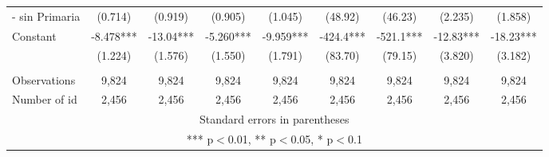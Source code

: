 {\begin{tabular}{lcccccccc}
-    sin Primaria & (0.714) & (0.919) & (0.905) & (1.045) & (48.92) & (46.23) & (2.235) & (1.858) \\
Constant & -8.478*** & -13.04*** & -5.260*** & -9.959*** & -424.4*** & -521.1*** & -12.83*** & -18.23*** \\
 & (1.224) & (1.576) & (1.550) & (1.791) & (83.70) & (79.15) & (3.820) & (3.182) \\
 &  &  &  &  &  &  &  &  \\
Observations & 9,824 & 9,824 & 9,824 & 9,824 & 9,824 & 9,824 & 9,824 & 9,824 \\
 Number of id & 2,456 & 2,456 & 2,456 & 2,456 & 2,456 & 2,456 & 2,456 & 2,456 \\ \hline
\multicolumn{9}{c}{ Standard errors in parentheses} \\
\multicolumn{9}{c}{ *** p$<$0.01, ** p$<$0.05, * p$<$0.1} \\
\end{tabular}
}